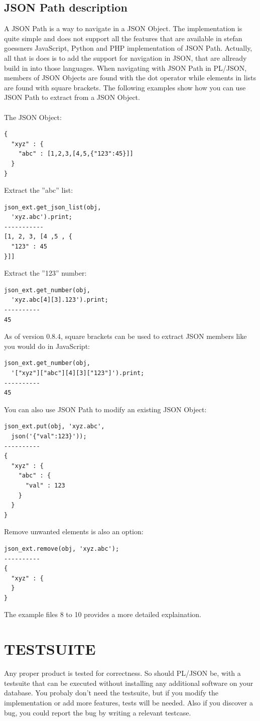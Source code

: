 \documentclass[11pt,twocolumn, a4paper]{article}
\begin{document}
\subsection*{JSON Path description}
A JSON Path is a way to navigate in a JSON Object. The implementation is quite simple and does not support all the features that are available in stefan goessners JavaScript, Python and PHP implementation of JSON Path. Actually, all that is does is to add the support for navigation in JSON, that are allready build in into those languages. When navigating with JSON Path in PL/JSON, members of JSON Objects are found with the dot operator while elements in lists are found with square brackets. The following examples show how you can use JSON Path to extract from a JSON Object.\\\\
The JSON Object:
\begin{verbatim}
{
  "xyz" : {
    "abc" : [1,2,3,[4,5,{"123":45}]]
  }
}
\end{verbatim}
Extract the ''abc'' list:
\begin{verbatim}
json_ext.get_json_list(obj, 
  'xyz.abc').print;
-----------
[1, 2, 3, [4 ,5 , {
  "123" : 45
}]]
\end{verbatim}
Extract the ''123'' number:
\begin{verbatim}
json_ext.get_number(obj,
  'xyz.abc[4][3].123').print;
----------
45
\end{verbatim}
As of version 0.8.4, square brackets can be used to extract JSON members like you would do in JavaScript: 
\begin{verbatim}
json_ext.get_number(obj,
  '["xyz"]["abc"][4][3]["123"]').print;
----------
45
\end{verbatim}
You can also use JSON Path to modify an existing JSON Object:
\begin{verbatim}
json_ext.put(obj, 'xyz.abc',
  json('{"val":123}'));
----------
{
  "xyz" : {
    "abc" : {
      "val" : 123
    }
  }
}
\end{verbatim}
Remove unwanted elements is also an option:
\begin{verbatim}
json_ext.remove(obj, 'xyz.abc');
----------
{
  "xyz" : {
  }
}
\end{verbatim}
The example files 8 to 10 provides a more detailed explaination.

\section*{TESTSUITE}
Any proper product is tested for correctness. So should PL/JSON be, with a testsuite that can be executed without installing any additional software on your database. You probaly don't need the testsuite, but if you modify the implementation or add more features, tests will be needed. Also if you discover a bug, you could report the bug by writing a relevant testcase.
\end{document}
